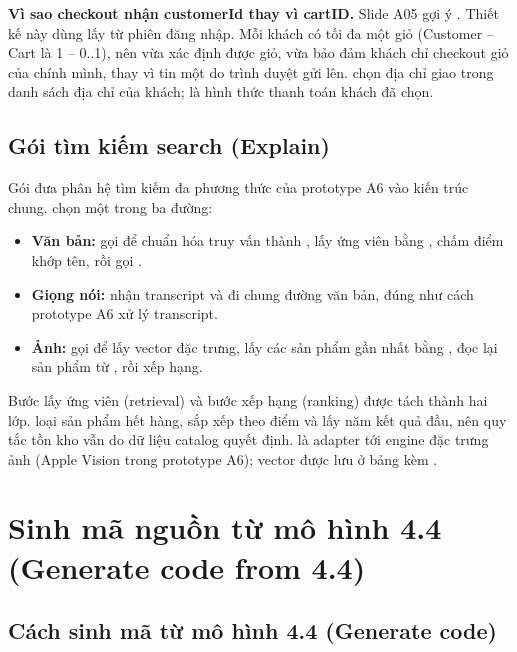 \documentclass[12pt,a4paper]{article}
\begin{document}
\textbf{Vì sao checkout nhận customerId thay vì cartID.} Slide A05 gợi ý
. Thiết kế này dùng  lấy từ phiên đăng
nhập. Mỗi khách có tối đa một giỏ (Customer -- Cart là 1 -- 0..1), nên  vừa xác định
được giỏ, vừa bảo đảm khách chỉ checkout giỏ của chính mình, thay vì tin một  do trình
duyệt gửi lên.  chọn địa chỉ giao trong danh sách địa chỉ của khách;  là
hình thức thanh toán khách đã chọn.

\subsection{Gói tìm kiếm search (Explain)}

Gói  đưa phân hệ tìm kiếm đa phương thức của prototype A6 vào
kiến trúc chung.  chọn một trong ba đường:
\begin{itemize}
\item \textbf{Văn bản:}  gọi  để chuẩn
hóa truy vấn thành , lấy ứng viên bằng , chấm điểm
khớp tên, rồi gọi .
\item \textbf{Giọng nói:}  nhận transcript và đi chung đường văn bản, đúng như cách
prototype A6 xử lý transcript.
\item \textbf{Ảnh:}  gọi  để lấy vector đặc trưng, lấy các sản
phẩm gần nhất bằng , đọc lại sản phẩm từ , rồi xếp hạng.
\end{itemize}
Bước lấy ứng viên (retrieval) và bước xếp hạng (ranking) được tách thành hai lớp. 
loại sản phẩm hết hàng, sắp xếp theo điểm và lấy năm kết quả đầu, nên quy tắc tồn kho vẫn do dữ liệu
catalog quyết định.  là adapter tới engine đặc trưng ảnh (Apple Vision trong
prototype A6); vector được lưu ở bảng  kèm .

\section{Sinh mã nguồn từ mô hình 4.4 (Generate code from 4.4)}\label{sec:45}

\subsection{Cách sinh mã từ mô hình 4.4 (Generate code)}
\end{document}
